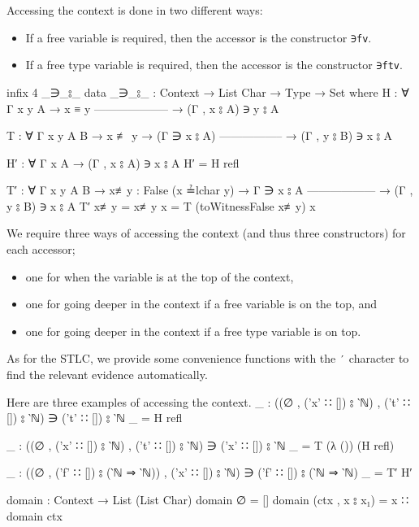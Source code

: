 \documentclass[logo,bsc,singlespacing,parskip,online]{infthesis}
\renewenvironment{code}{\mintedcopy[breaklines,breaksymbolleft=\;]{agda}}{\endmintedcopy}
\begin{document}
Accessing the context is done in two different ways:
\begin{itemize}
  \item If a free variable is required, then the accessor is the constructor \texttt{∋fv}.
  \item If a free type variable is required, then the accessor is the constructor \texttt{∋ftv}.
\end{itemize}
\begin{code}
  infix  4  _∋_⦂_
  data _∋_⦂_ : Context → List Char → Type → Set where
    H : ∀ {Γ x y A}
      → x ≡ y
        --------------------
      → (Γ , x ⦂ A) ∋ y ⦂ A

    T : ∀ {Γ x y A B}
      → x ≢ y
      → (Γ ∋ x ⦂ A)
        -----------------
      → (Γ , y ⦂ B) ∋ x ⦂ A

  H′ : ∀ {Γ x A} → (Γ , x ⦂ A) ∋ x ⦂ A
  H′ = H refl

  T′ : ∀ {Γ x y A B}
    → {x≢y : False (x ≟lchar y)}
    → Γ ∋ x ⦂ A
      ------------------
    → (Γ , y ⦂ B) ∋ x ⦂ A
  T′ { x≢y = x≢y } x = T (toWitnessFalse x≢y) x
\end{code}

We require three ways of accessing the context (and thus three constructors) for each accessor;
\begin{itemize}
  \item one for when the variable is at the top of the context,
  \item one for going deeper in the context if a free variable is on the top, and
  \item one for going deeper in the context if a free type variable is on top.
\end{itemize}

As for the STLC, we provide some convenience functions with the \texttt{′} character to find the
relevant evidence automatically.

Here are three examples of accessing the context.
\begin{code}
  _ : ((∅ , ('x' ∷ []) ⦂ ‵ℕ) , ('t' ∷ []) ⦂ ‵ℕ) ∋ ('t' ∷ []) ⦂ ‵ℕ
  _ = H refl

  _ : ((∅ , ('x' ∷ []) ⦂ ‵ℕ) , ('t' ∷ []) ⦂ ‵ℕ) ∋ ('x' ∷ []) ⦂ ‵ℕ
  _ = T (λ ()) (H refl)

  _ : ((∅ , ('f' ∷ []) ⦂ (‵ℕ ⇒ ‵ℕ)) , ('x' ∷ []) ⦂ ‵ℕ) ∋ ('f' ∷ []) ⦂ (‵ℕ ⇒ ‵ℕ)
  _ = T′ H′
\end{code}

\begin{code}
  domain : Context → List (List Char)
  domain ∅ = []
  domain (ctx , x ⦂ x₁) = x ∷ domain ctx
\end{code}
\end{document}
